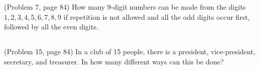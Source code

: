 \documentclass[
]{article}
\begin{document}
(Problem 7, page 84) How many \(9\)-digit numbers can be made from the
digits \(1,2,3,4,5,6,7,8,9\) if repetition is not allowed and all the
odd digits occur first, followed by all the even digits.

\vfill\eject

\hypertarget{section-1}{%
\subsection{}\label{section-1}}

(Problem 15, page 84) In a club of 15 people, there is a president,
vice-president, secretary, and treasurer. In how many different ways can
this be done?

\vfill\eject

\hypertarget{section-2}{%
\subsection{}\label{section-2}}
\end{document}

